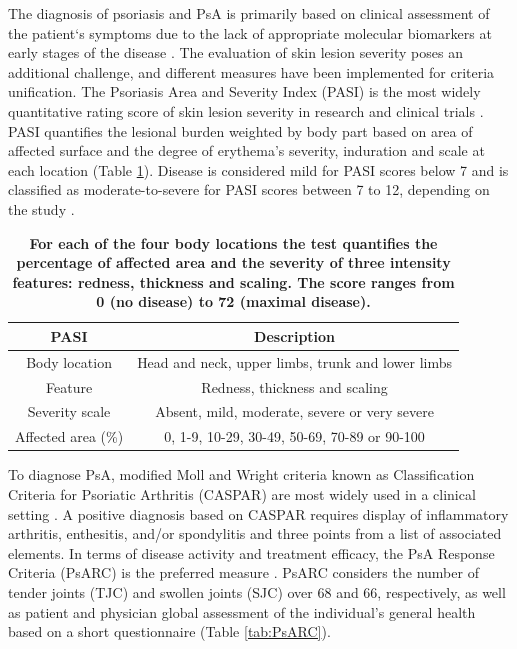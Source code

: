 The diagnosis of psoriasis and PsA is primarily based on clinical assessment of the patient`s symptoms due to the lack of appropriate molecular biomarkers at early stages of the disease \parencite{Villanova2013}. The evaluation of skin lesion severity poses an additional challenge, and different measures have been implemented for criteria unification. The Psoriasis Area and Severity Index (PASI) is the most widely quantitative rating score of skin lesion severity in research and clinical trials \parencite{Fredriksson1978,Finlay2005}. PASI quantifies the lesional burden weighted by body part based on area of affected surface and the degree of erythema’s severity, induration and scale at each location (Table \ref{tab:PASI}). Disease is considered mild for PASI scores below 7 and is classified as moderate-to-severe for PASI scores between 7 to 12, depending on the study \parencite{Finlay2005, Schmitt2005,Langewouters2008}.


\begin{table}[htbp]
\setlength{\tabcolsep}{20pt}
\renewcommand{\arraystretch}{1.5}
\begin{tabular}{@{} c c}
\toprule
\textbf{PASI} & \textbf{Description} \\
\midrule
\midrule
Body location  & Head and neck, upper limbs, trunk and lower limbs\\
Feature        & Redness, thickness and scaling \\
Severity scale & Absent, mild, moderate, severe or very severe \\
Affected area (\%)  & 0, 1-9, 10-29, 30-49, 50-69, 70-89 or 90-100 \\
\bottomrule
\end{tabular}
\medskip %
\caption[Variables and scoring used in the Psoriasis Area and Severity Index (PASI)]{\textbf{For each of the four body locations the test quantifies the percentage of affected area and the severity of three intensity features: redness, thickness and scaling. The score ranges from 0 (no disease) to 72 (maximal disease).}}
\label{tab:PASI}
\end{table}
\bigskip %


To diagnose PsA, modified Moll and Wright criteria known as Classification Criteria for Psoriatic Arthritis (CASPAR) are most widely used in a clinical setting \parencite {Taylor2006}. A positive diagnosis based on CASPAR requires display of inflammatory arthritis, enthesitis, and/or spondylitis and three points from a list of associated elements. In terms of disease activity and treatment efficacy, the PsA Response Criteria (PsARC) is the preferred measure \parencite{Philipp2011,Clegg1996}. PsARC considers the number of tender joints (TJC) and swollen joints (SJC) over 68 and 66, respectively, as well as patient and physician global assessment of the individual's general health based on a short questionnaire (Table \ref{tab:PsARC}). 

